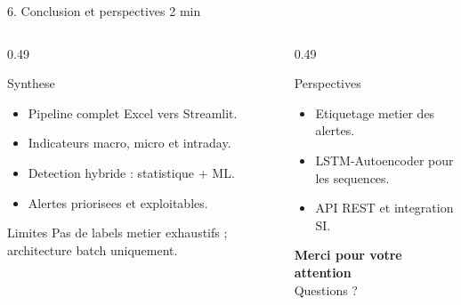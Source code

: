 \documentclass[aspectratio=169,10pt]{beamer}
\newcommand{\duration}[1]{\hfill{\scriptsize\color{bvcgold}#1}}
\begin{document}
\begin{frame}{6. Conclusion et perspectives \duration{2 min}}
  \begin{columns}[T,onlytextwidth]
    \begin{column}{0.49\textwidth}
      \begin{block}{Synthese}
        \begin{itemize}
          \item Pipeline complet Excel vers Streamlit.
          \item Indicateurs macro, micro et intraday.
          \item Detection hybride : statistique + ML.
          \item Alertes priorisees et exploitables.
        \end{itemize}
      \end{block}
      \begin{block}{Limites}
        Pas de labels metier exhaustifs ; architecture batch uniquement.
      \end{block}
    \end{column}
    \begin{column}{0.49\textwidth}
      \begin{block}{Perspectives}
        \begin{itemize}
          \item Etiquetage metier des alertes.
          \item LSTM-Autoencoder pour les sequences.
          \item API REST et integration SI.
        \end{itemize}
      \end{block}
      \vspace{0.8em}
      \centering
      {\Large\bfseries Merci pour votre attention}\\[0.4em]
      {\large Questions ?}
    \end{column}
  \end{columns}
\end{frame}
\end{document}
